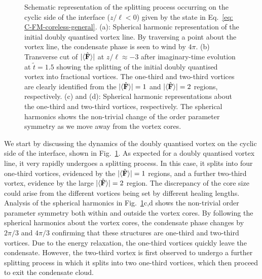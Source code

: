 \begin{figure}
    \caption[Dynamics of the doubly quantised vortex connection in a cyclic to a
        ferromagnetic interface]
    {\label{fig: C-FM-coreless-cyclic}Schematic representation of the
        splitting process occurring on the cyclic side of the interface
        (\(z/\ell < 0\)) given by the state in
        Eq.~\eqref{eq: C-FM-coreless-general}.
        (a): Spherical harmonic representation of the initial doubly quantised
        vortex line. By traversing a point about the vortex line, the condensate
        phase is seen to wind by \(4\pi \).
        (b) Transverse cut of \(|\langle \hat{\vb{F}} \rangle | \) at \(z/\ell \approx -3\) after
        imaginary-time evolution at \(\tilde{t} = 1.5\) showing the splitting of
        the initial doubly quantised vortex into fractional vortices.
        The one-third and two-third vortices are clearly identified from the
        \(|\langle \hat{\vb{F}} \rangle | = 1\) and \(|\langle \hat{\vb{F}} \rangle | = 2\) regions, respectively.
        (c) and (d): Spherical harmonic representations about the one-third and
        two-third vortices, respectively.
        The spherical harmonics shows the non-trivial change of the order
        parameter symmetry as we move away from the vortex cores.}
\end{figure}
We start by discussing the dynamics of the doubly quantised vortex on the cyclic
side of the interface, shown in Fig.~\ref{fig: C-FM-coreless-cyclic}.
As expected for a doubly quantised vortex line, it very rapidly undergoes a
splitting process.
In this case, it splits into four one-third vortices, evidenced by the
\(|\langle \hat{\vb{F}} \rangle | = 1\) regions, and a further two-third vortex, evidence by the large
\(|\langle \hat{\vb{F}} \rangle | = 2\) region.
The discrepancy of the core size could arise from the different vortices being
set by different healing lengths.
Analysis of the spherical harmonics in Fig.~\ref{fig: C-FM-coreless-cyclic}c,d
shows the non-trivial order parameter symmetry both within and outside the
vortex cores.
By following the spherical harmonics about the vortex cores, the condensate
phase changes by \(2\pi/3\) and \(4\pi/3\) confirming that these structures are
one-third and two-third vortices.
Due to the energy relaxation, the one-third vortices quickly leave the
condensate.
However, the two-third vortex is first observed to undergo a further splitting
process in which it splits into two one-third vortices, which then proceed to
exit the condensate cloud.

